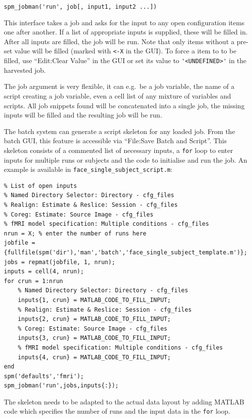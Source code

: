 \verb|spm_jobman('run', job[, input1, input2 ...])|

This interface takes a job and asks for the input to any open configuration
items one after another. If a list of appropriate inputs is supplied, these
will be filled in. After all inputs are filled, the job will be run. Note that
only items without a pre-set value will be filled (marked with \verb|<-X| in
the GUI). To force a item to to be filled, use ``Edit:Clear Value''
in the GUI or set its value to \verb|'<UNDEFINED>'| in the harvested job.

The job argument is very flexible, it can e.g.\ be a job variable, the
name of a script creating a job variable, even a cell list of any
mixture of variables and scripts. All job snippets found will be
concatenated into a single job, the missing inputs will be filled and
the resulting job will be run.

The batch system can generate a script skeleton for any loaded
job. From the batch GUI, this feature is accessible via ``File:Save
Batch and Script''. This skeleton consists of a commented list of
necessary inputs, a \verb|for| loop to enter inputs for multiple runs
or subjects and the code to initialise and run the job. An example is
available in \verb|face_single_subject_script.m|:

\begin{verbatim}
% List of open inputs
% Named Directory Selector: Directory - cfg_files
% Realign: Estimate & Reslice: Session - cfg_files
% Coreg: Estimate: Source Image - cfg_files
% fMRI model specification: Multiple conditions - cfg_files
nrun = X; % enter the number of runs here
jobfile = {fullfile(spm('dir'),'man','batch','face_single_subject_template.m')};
jobs = repmat(jobfile, 1, nrun);
inputs = cell(4, nrun);
for crun = 1:nrun
    % Named Directory Selector: Directory - cfg_files
    inputs{1, crun} = MATLAB_CODE_TO_FILL_INPUT;
    % Realign: Estimate & Reslice: Session - cfg_files
    inputs{2, crun} = MATLAB_CODE_TO_FILL_INPUT; 
    % Coreg: Estimate: Source Image - cfg_files
    inputs{3, crun} = MATLAB_CODE_TO_FILL_INPUT; 
    % fMRI model specification: Multiple conditions - cfg_files
    inputs{4, crun} = MATLAB_CODE_TO_FILL_INPUT; 
end
spm('defaults','fmri');
spm_jobman('run',jobs,inputs{:});
\end{verbatim}

The skeleton needs to be adapted to the actual data layout by adding
MATLAB code which specifies the number of runs and the input data in
the \verb|for| loop.

